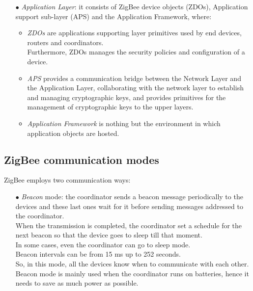 \documentclass[12pt]{report}
\begin{document}
{\begin{itemize}
\item[$\bullet$] \emph{Application Layer}: it consists of ZigBee device objects (ZDOs), Application support sub-layer (APS) and the Application Framework, where: 

\begin{itemize}
\item \emph{ZDOs} are applications supporting layer primitives used by end devices, routers and coordinators.\\ 
Furthermore, ZDOs manages the security policies and configuration of a device.
\item \emph{APS} provides a communication bridge between the Network Layer and the Application Layer, collaborating with the network layer to establish and managing cryptographic keys, and provides primitives for the management of cryptographic keys to the upper layers.
\item \emph{Application Framework} is nothing but the environment in which application objects are hosted.\\

\end{itemize}
\end{itemize}

\subsection{ZigBee communication modes}
\bigskip
ZigBee employs two communication ways:
\bigskip
\begin{itemize}
\setlength{\itemindent}{+4mm}
\item[$\bullet$] \emph{Beacon} mode: the coordinator sends a beacon message periodically to the devices and these last ones wait for it before sending messages addressed to the coordinator.\\
When the transmission is completed, the coordinator set a schedule for the next beacon so that the device goes to sleep till that moment.\\
In some cases, even the coordinator can go to sleep mode.\\
Beacon intervals can be from 15 ms up to 252 seconds.\\
So, in this mode, all the devices know when to communicate with each other.\\
Beacon mode is mainly used when the coordinator runs on batteries, hence it needs to save as much power as possible.


\end{itemize}}
\end{document}
